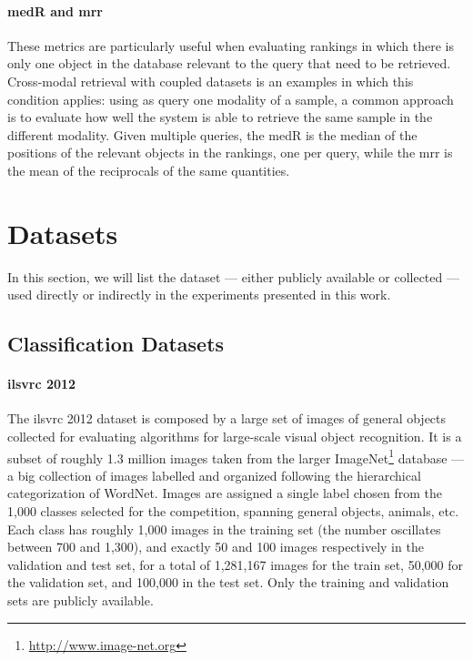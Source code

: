 \paragraph{\acrlong{medR} and \acrlong{mrr}}
These metrics are particularly useful when evaluating rankings in which there is only one object in the database relevant to the query that need to be retrieved.
Cross-modal retrieval with coupled datasets is an examples in which this condition applies: using as query one modality of a sample, a common approach is to evaluate how well the system is able to retrieve the same sample in the different modality.
Given multiple queries, the \acrfull{medR} is the median of the positions of the relevant objects in the rankings, one per query,
while the \acrfull{mrr} is the mean of the reciprocals of the same quantities.



\section{Datasets}
\label{sec:back:datasets}
In this section, we will list the dataset --- either publicly available or collected --- used directly or indirectly in the experiments presented in this work.

\subsection{Classification Datasets}

\paragraph{\acrfull{ilsvrc} 2012~~\cite{russakovsky2015imagenet}}
The \acrfull{ilsvrc} 2012 dataset is composed by a large set of images of general objects collected for evaluating algorithms for large-scale visual object recognition.
It is a subset of roughly 1.3 million images taken from the larger ImageNet\footnote{\url{http://www.image-net.org}} database --- a big collection of images labelled and organized following the hierarchical categorization of WordNet.
Images are assigned a single label chosen from the 1,000 classes selected for the competition, spanning general objects, animals, etc.
Each class has roughly 1,000 images in the training set (the number oscillates between 700 and 1,300), and exactly 50 and 100 images respectively in the validation and test set, for a total of 1,281,167 images for the train set, 50,000 for the validation set, and 100,000 in the test set.
Only the training and validation sets are publicly available.

